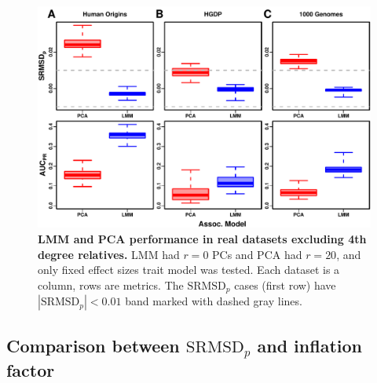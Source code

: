 \documentclass[11pt]{article}
\newcommand{\rmsd}{\text{SRMSD}_p}
\begin{document}
\begin{figure}[bp!]
  \centering
  \includegraphics[width=\textwidth]{fes/rmsd-auc_king-cutoff-4.pdf}
  \caption{
    {\bf LMM and PCA performance in real datasets excluding 4th degree relatives.}
    LMM had $r=0$ PCs and PCA had $r=20$, and only fixed effect sizes trait model was tested.
    Each dataset is a column, rows are metrics.
    The $\rmsd$ cases (first row) have $|\rmsd| < 0.01$ band marked with dashed gray lines.
  }
  \label{fig:king_cutoff}
\end{figure}



\subsection{Comparison between $\rmsd$ and inflation factor}
\end{document}
